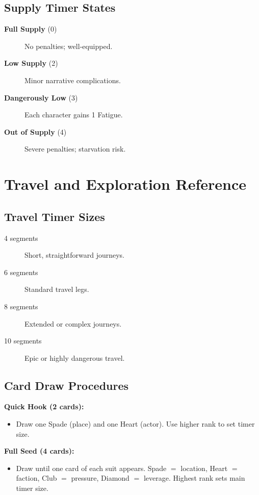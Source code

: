 \subsection{Supply Timer States}\label{subsec:supply_ref}
\begin{description}
    \item[\textbf{Full Supply} (0)] No penalties; well‑equipped.
    \item[\textbf{Low Supply} (2)] Minor narrative complications.
    \item[\textbf{Dangerously Low} (3)] Each character gains 1 Fatigue.
    \item[\textbf{Out of Supply} (4)] Severe penalties; starvation risk.
\end{description}

\newpage
\section{Travel and Exploration Reference}\label{sec:travel_reference}

\subsection{Travel Timer Sizes}\label{subsec:travel_timers_ref}
\begin{description}
    \item[4 segments] Short, straightforward journeys.
    \item[6 segments] Standard travel legs.
    \item[8 segments] Extended or complex journeys.
    \item[10 segments] Epic or highly dangerous travel.
\end{description}

\subsection{Card Draw Procedures}\label{subsec:card_draw_ref}
\textbf{Quick Hook (2 cards):}
\begin{itemize}
    \item Draw one Spade (place) and one Heart (actor). Use higher rank to set timer size.
\end{itemize}
\textbf{Full Seed (4 cards):}
\begin{itemize}
    \item Draw until one card of each suit appears. Spade $=$ location, Heart $=$ faction, Club $=$ pressure, Diamond $=$ leverage. Highest rank sets main timer size.
\end{itemize}

